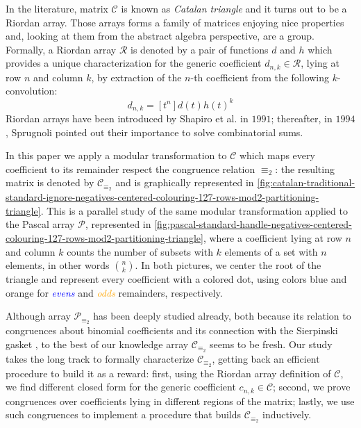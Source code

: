 In the literature, matrix $\mathcal{C}$ is known as \emph{Catalan triangle} and
it turns out to be a Riordan array. Those arrays forms a family of matrices enjoying
nice properties and, looking at them from the abstract algebra perspective, are a group. 
Formally, a Riordan array $\mathcal{R}$ is denoted by a pair of functions $d$ and $h$ which provides a unique 
characterization for the generic coefficient $d_{n,k}\in\mathcal{R}$, lying at row $n$ and column $k$, 
by extraction of the $n$-th coefficient from the following $k$-convolution:
\begin{equation}
    d_{n,k} = [t^{n}]d(t)h(t)^{k}
    \label{eq:Riordan:array:coefficient}
\end{equation}
Riordan arrays have been introduced by Shapiro et al. \cite{shapiro:1991} in $1991$;
thereafter, in $1994$, Sprugnoli \cite{sprugnoli:1991} pointed out their importance
to solve combinatorial sums.

In this paper we apply a modular transformation to $\mathcal{C}$ which maps every coefficient 
to its remainder respect the congruence relation $\equiv_{2}$: the resulting matrix is 
denoted by $\mathcal{C}_{\equiv_{2}}$ and is graphically represented in 
\autoref{fig:catalan-traditional-standard-ignore-negatives-centered-colouring-127-rows-mod2-partitioning-triangle}.
This is a parallel study of the same modular transformation applied to the Pascal array $\mathcal{P}$,
represented in \autoref{fig:pascal-standard-handle-negatives-centered-colouring-127-rows-mod2-partitioning-triangle},
where a coefficient lying at row $n$ and column $k$ counts the number of subsets
with $k$ elements of a set with $n$ elements, in other words ${{n}\choose{k}}$.
In both pictures, we center the root of the triangle and represent every coefficient 
with a colored dot, using colors blue and orange 
for \textcolor{blue}{\emph{evens}} and \textcolor{orange}{\emph{odds}} remainders, respectively. 

Although array $\mathcal{P}_{\equiv_{2}}$ has been deeply studied already, both because its 
relation to congruences about binomial coefficients and its connection with
the Sierpinski gasket \cite{stewart:four:encounters:sierpinski, sokolov},
to the best of our knowledge array $\mathcal{C}_{\equiv_{2}}$ seems to be fresh.  
Our study takes the long track to formally characterize $\mathcal{C}_{\equiv_{2}}$,
getting back an efficient procedure to build it as a reward: first,
using the Riordan array definition of $\mathcal{C}$, we find different closed form for
the generic coefficient $c_{n,k}\in\mathcal{C}$; second, we prove congruences over coefficients
lying in different regions of the matrix; lastly, we use such congruences to implement a procedure
that builds $\mathcal{C}_{\equiv_{2}}$ inductively. 


